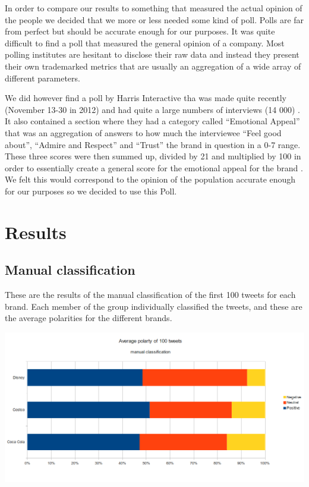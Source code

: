 \documentclass[a4paper,12pt]{report}
\begin{document}
In order to compare our results to something that measured the actual opinion of the people we decided that we more or less needed some kind of poll. 
Polls are far from perfect but should be accurate enough for our purposes. It was quite difficult to find a poll that measured the general opinion of a company. 
Most polling institutes are hesitant to disclose their raw data and instead they present their own trademarked metrics that are usually an aggregation of a wide array of different parameters.

We did however find a poll by Harris Interactive tha was made quite recently (November 13-30 in 2012) and had quite a large numbers of interviews (14 000) \cite{Harris13}. 
It also contained a section where they had a category called “Emotional Appeal” that was an aggregation of answers to how much the interviewee “Feel good about”, “Admire and Respect” and “Trust” the brand in question in a 0-7 range. 
These three scores were then summed up, divided by 21 and multiplied by 100 in order to essentially create a general score for the emotional appeal for the brand \cite{Harris13}. 
We felt this would correspond to the opinion of the population accurate enough for our purposes so we decided to use this Poll.

\chapter{Results}

\section{Manual classification}

These are the results of the manual classification of the first 100 tweets for each brand. Each member of the group individually classified the tweets, and these are the average polarities for the different brands.

\centerline{\includegraphics[scale=0.6]{../img/man1.png}}
\end{document}
